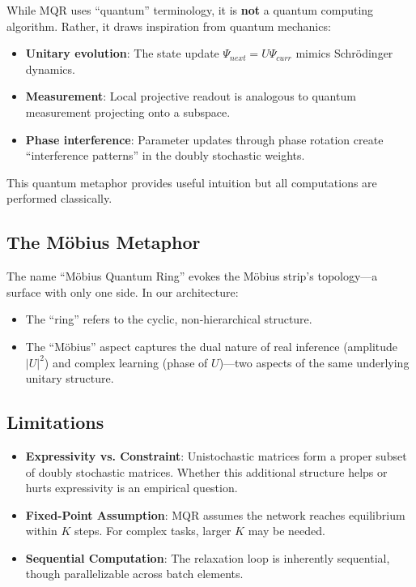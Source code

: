 \documentclass[11pt,a4paper]{article}
\begin{document}
While MQR uses ``quantum'' terminology, it is \textbf{not} a quantum computing algorithm. Rather, it draws inspiration from quantum mechanics:

\begin{itemize}
    \item \textbf{Unitary evolution}: The state update $\Psi_{next} = U\Psi_{curr}$ mimics Schrödinger dynamics.
    \item \textbf{Measurement}: Local projective readout is analogous to quantum measurement projecting onto a subspace.
    \item \textbf{Phase interference}: Parameter updates through phase rotation create ``interference patterns'' in the doubly stochastic weights.
\end{itemize}

This quantum metaphor provides useful intuition but all computations are performed classically.

\subsection{The Möbius Metaphor}

The name ``Möbius Quantum Ring'' evokes the Möbius strip's topology---a surface with only one side. In our architecture:

\begin{itemize}
    \item The ``ring'' refers to the cyclic, non-hierarchical structure.
    \item The ``Möbius'' aspect captures the dual nature of real inference (amplitude $|U|^2$) and complex learning (phase of $U$)---two aspects of the same underlying unitary structure.
\end{itemize}

\subsection{Limitations}

\begin{itemize}
    \item \textbf{Expressivity vs. Constraint}: Unistochastic matrices form a proper subset of doubly stochastic matrices. Whether this additional structure helps or hurts expressivity is an empirical question.
    
    \item \textbf{Fixed-Point Assumption}: MQR assumes the network reaches equilibrium within $K$ steps. For complex tasks, larger $K$ may be needed.
    
    \item \textbf{Sequential Computation}: The relaxation loop is inherently sequential, though parallelizable across batch elements.
\end{itemize}
\end{document}
